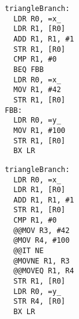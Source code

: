 \begin{center}
    \begin{minipage}{0.22\textwidth}
    \begin{lstlisting}[style=AsmStyle]
triangleBranch:
  LDR R0, =x_
  LDR R1, [R0]
  ADD R1, R1, #1
  STR R1, [R0]
  CMP R1, #0
  BEQ FBB
  LDR R0, =x_
  MOV R1, #42
  STR R1, [R0]
FBB:
  LDR R0, =y_
  MOV R1, #100
  STR R1, [R0]
  BX LR
    \end{lstlisting}
    \end{minipage}
    \hfill
    \begin{minipage}{0.22\textwidth}
    \end{minipage}
    \hfill
    \begin{minipage}{0.22\textwidth}
    \begin{lstlisting}[style=AsmStyle]
triangleBranch:
  LDR R0, =x_
  LDR R1, [R0]
  ADD R1, R1, #1
  STR R1, [R0]
  CMP R1, #0
  @@MOV R3, #42
  @MOV R4, #100
  @@IT NE
  @MOVNE R1, R3
  @@MOVEQ R1, R4
  STR R1, [R0]
  LDR R0, =y_
  STR R4, [R0]
  BX LR
    \end{lstlisting}
    \end{minipage}
    \hfill
    \begin{minipage}{0.22\textwidth}
    \end{minipage}
    \end{center}